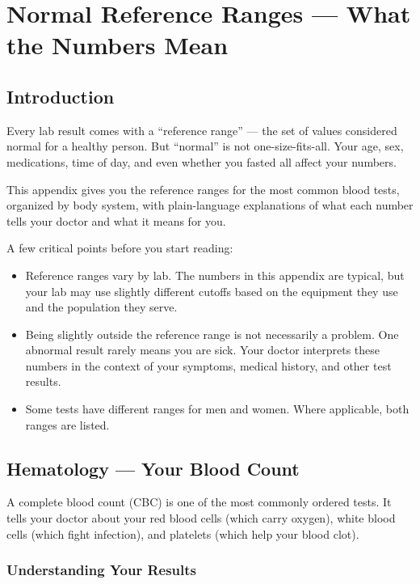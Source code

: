 \chapter{Normal Reference Ranges --- What the Numbers Mean}
\label{app:reference_ranges}

\clearpage
\section{Introduction}

Every lab result comes with a ``reference range'' --- the set of values considered normal for a healthy person. But ``normal'' is not one-size-fits-all. Your age, sex, medications, time of day, and even whether you fasted all affect your numbers.

This appendix gives you the reference ranges for the most common blood tests, organized by body system, with plain-language explanations of what each number tells your doctor and what it means for you.

A few critical points before you start reading:
\begin{itemize}
    \item Reference ranges vary by lab. The numbers in this appendix are typical, but your lab may use slightly different cutoffs based on the equipment they use and the population they serve.
    \item Being slightly outside the reference range is not necessarily a problem. One abnormal result rarely means you are sick. Your doctor interprets these numbers in the context of your symptoms, medical history, and other test results.
    \item Some tests have different ranges for men and women. Where applicable, both ranges are listed.
\end{itemize}

\clearpage
\section{Hematology --- Your Blood Count}

A complete blood count (CBC) is one of the most commonly ordered tests. It tells your doctor about your red blood cells (which carry oxygen), white blood cells (which fight infection), and platelets (which help your blood clot).

\subsection{Understanding Your Results}


